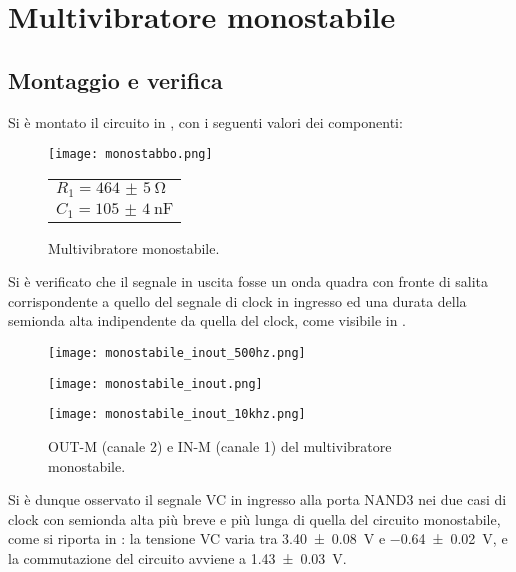 \section{Multivibratore monostabile}
\subsection{Montaggio e verifica}

Si è montato il circuito in , con i seguenti valori dei componenti:

\begin{figure}[H]
	\begin{minipage}{0.8\textwidth}
		\centering
		\texttt{[image: monostabbo.png]}
		\caption{Multivibratore monostabile.}
		\label{monocazzo}
	\end{minipage}
	\begin{minipage}{0.1\textwidth}
		\begin{tabular}{l}
			$R_1 = \SI{464(5)}{\ohm}$\\
			$C_1 = \SI{105(4)}{\nano \farad}$
		\end{tabular}
	\end{minipage}
\end{figure}

Si è verificato che il segnale in uscita fosse un onda quadra con fronte
di salita corrispondente a quello del segnale di clock in ingresso ed una durata
della semionda alta indipendente da quella del clock, come visibile in .

\begin{figure}[H]
	\centering
	\begin{minipage}{0.3\textwidth}
		\texttt{[image: monostabile\_inout\_500hz.png]}
	\end{minipage}
	\begin{minipage}{0.3\textwidth}
		\texttt{[image: monostabile\_inout.png]}
	\end{minipage}
	\begin{minipage}{0.3\textwidth}
		\texttt{[image: monostabile\_inout\_10khz.png]}
	\end{minipage}
	\caption{OUT-M (canale 2) e IN-M (canale 1) del multivibratore monostabile.}
	\label{monoinout}
\end{figure}

Si è dunque osservato il segnale VC in ingresso alla porta NAND3 nei due casi di
clock con semionda alta più breve e più lunga di quella del circuito
monostabile, come si riporta in : la tensione VC varia tra \SI{3.40(8)}{\V} e \SI{-0.64(2)}{\V}, e la commutazione del circuito avviene a  \SI{1.43(3)}{\V}.

